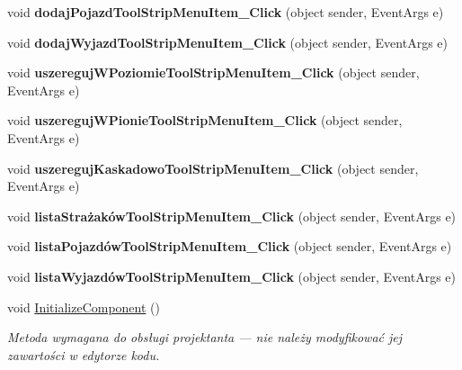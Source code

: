 \begin{DoxyCompactItemize}
void {\bfseries dodaj\+Pojazd\+Tool\+Strip\+Menu\+Item\+\_\+\+Click} (object sender, Event\+Args e)
\item 
\mbox{\label{class_statystyki___o_s_p_1_1_menu_glowne_a4da336ddc5816c2de6354942d75ab6c5}} 
void {\bfseries dodaj\+Wyjazd\+Tool\+Strip\+Menu\+Item\+\_\+\+Click} (object sender, Event\+Args e)
\item 
\mbox{\label{class_statystyki___o_s_p_1_1_menu_glowne_a91e395af6f0bba61365a4a9d7ac9a504}} 
void {\bfseries uszereguj\+W\+Poziomie\+Tool\+Strip\+Menu\+Item\+\_\+\+Click} (object sender, Event\+Args e)
\item 
\mbox{\label{class_statystyki___o_s_p_1_1_menu_glowne_af20e49b3e91f5e5c5023b2b33de70af5}} 
void {\bfseries uszereguj\+W\+Pionie\+Tool\+Strip\+Menu\+Item\+\_\+\+Click} (object sender, Event\+Args e)
\item 
\mbox{\label{class_statystyki___o_s_p_1_1_menu_glowne_a4e10ded23153b6bff387f8a17eb41e71}} 
void {\bfseries uszereguj\+Kaskadowo\+Tool\+Strip\+Menu\+Item\+\_\+\+Click} (object sender, Event\+Args e)
\item 
\mbox{\label{class_statystyki___o_s_p_1_1_menu_glowne_adbbe12755621c371257b480c79a4b63f}} 
void {\bfseries lista\+Strażaków\+Tool\+Strip\+Menu\+Item\+\_\+\+Click} (object sender, Event\+Args e)
\item 
\mbox{\label{class_statystyki___o_s_p_1_1_menu_glowne_a3c3045303bff15eae72b9ae6381f7b9e}} 
void {\bfseries lista\+Pojazdów\+Tool\+Strip\+Menu\+Item\+\_\+\+Click} (object sender, Event\+Args e)
\item 
\mbox{\label{class_statystyki___o_s_p_1_1_menu_glowne_a6b940fec8a48228b6517682a8af0ccc1}} 
void {\bfseries lista\+Wyjazdów\+Tool\+Strip\+Menu\+Item\+\_\+\+Click} (object sender, Event\+Args e)
\item 
void \mbox{\hyperlink{class_statystyki___o_s_p_1_1_menu_glowne_aca15682a01932d773612d86efd95922f}{Initialize\+Component}} ()
\begin{DoxyCompactList}\small\item\em Metoda wymagana do obsługi projektanta — nie należy modyfikować jej zawartości w edytorze kodu. \end{DoxyCompactList}\end{DoxyCompactItemize}
